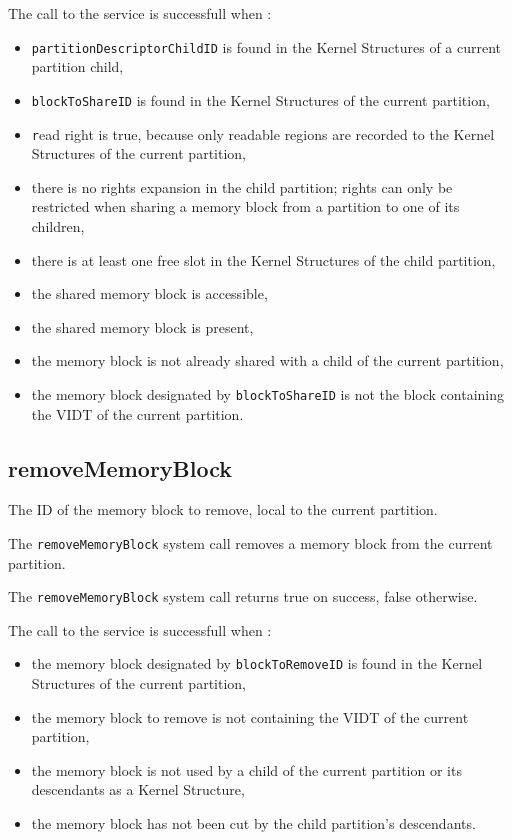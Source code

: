\documentclass[10pt,a4paper,titlepage]{refart}
\begin{document}
The call to the service is successfull when :
\begin{itemize}
    \item \texttt{partitionDescriptorChildID} is found in the Kernel Structures of a current partition child,
    \item \texttt{blockToShareID} is found in the Kernel Structures of the current partition,
    \item \texttt{r}ead right is true, because only readable regions are recorded to the Kernel Structures of the current partition,
    \item there is no rights expansion in the child partition; rights can only be restricted when sharing a memory block from a partition to one of its children,
    \item there is at least one free slot in the Kernel Structures of the child partition,
    \item the shared memory block is accessible,
    \item the shared memory block is present,
    \item the memory block is not already shared with a child of the current partition,
    \item the memory block designated by \texttt{blockToShareID} is not the block containing the VIDT of the current partition.
\end{itemize}

\subsection{removeMemoryBlock}
The ID of the memory block to remove, local to the current partition.

\medskip
The \texttt{removeMemoryBlock} system call removes a memory block from the current partition.

The \texttt{removeMemoryBlock} system call returns true on success, false otherwise.

The call to the service is successfull when :
\begin{itemize}
    \item the memory block designated by \texttt{blockToRemoveID} is found in the Kernel Structures of the current partition,
    \item the memory block to remove is not containing the VIDT of the current partition,
    \item the memory block is not used by a child of the current partition or its descendants as a Kernel Structure,
    \item the memory block has not been cut by the child partition's descendants.
\end{itemize}
\end{document}
